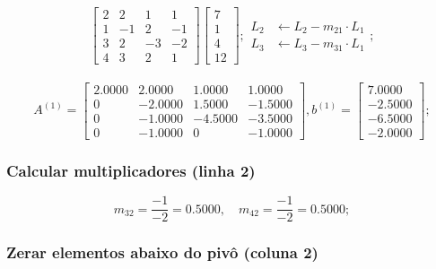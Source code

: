 \documentclass[12pt]{article}
\begin{document}
                \[
                \begin{bmatrix}
                    2 & 2 & 1 & 1 \\
                    1 & -1 & 2 & -1 \\
                    3 & 2 & -3 & - 2\\
                    4 & 3 & 2 & 1
                \end{bmatrix}
                \begin{bmatrix}
                    7 \\ 1 \\ 4 \\ 12
                \end{bmatrix};
                \begin{aligned}
                    L_2 &\leftarrow L_2 - m_{21} \cdot L_1 \\
                    L_3 &\leftarrow L_3 - m_{31} \cdot L_1
                \end{aligned};
                \]\\

                \[
                A^{(1)} = \begin{bmatrix}
                    2.0000 & 2.0000 & 1.0000 & 1.0000 \\
                    0 & -2.0000 & 1.5000 & -1.5000 \\
                    0 & -1.0000 & -4.5000 & -3.5000 \\
                    0 & -1.0000 & 0 & -1.0000
                \end{bmatrix},
                b^{(1)} = \begin{bmatrix}
                        7.0000 \\ -2.5000 \\ -6.5000 \\ -2.0000
                \end{bmatrix};
                \]

            \subsubsection{Calcular multiplicadores (linha 2)}

                \[
                m_{32} = \frac{-1}{-2} = 0.5000, \quad m_{42} = \frac{-1}{-2} = 0.5000;
                \]

            \subsubsection{Zerar elementos abaixo do pivô (coluna 2)}
\end{document}

